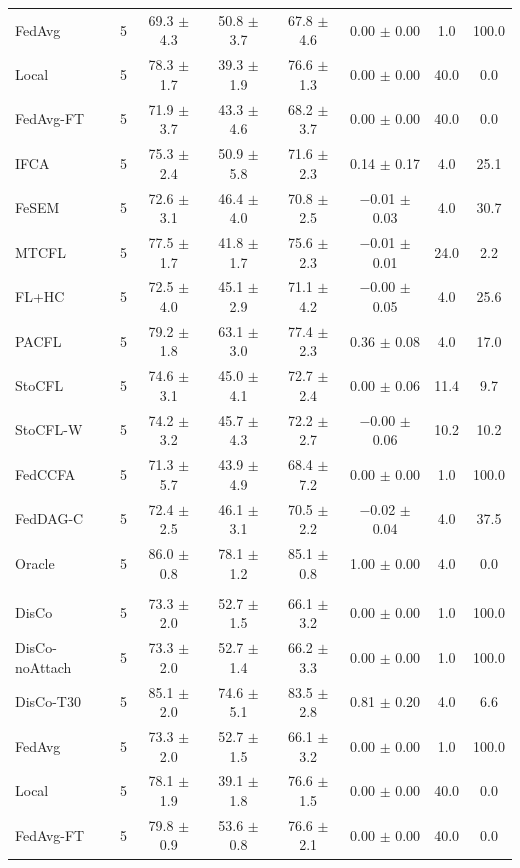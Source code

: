 {\begin{tabular}{l r c c c c c c}
FedAvg & 5 & 69.3 $\pm$ 4.3 & 50.8 $\pm$ 3.7 & 67.8 $\pm$ 4.6 & 0.00 $\pm$ 0.00 & 1.0 & 100.0 \\
Local & 5 & 78.3 $\pm$ 1.7 & 39.3 $\pm$ 1.9 & 76.6 $\pm$ 1.3 & 0.00 $\pm$ 0.00 & 40.0 & 0.0 \\
FedAvg-FT & 5 & 71.9 $\pm$ 3.7 & 43.3 $\pm$ 4.6 & 68.2 $\pm$ 3.7 & 0.00 $\pm$ 0.00 & 40.0 & 0.0 \\
IFCA & 5 & 75.3 $\pm$ 2.4 & 50.9 $\pm$ 5.8 & 71.6 $\pm$ 2.3 & 0.14 $\pm$ 0.17 & 4.0 & 25.1 \\
FeSEM & 5 & 72.6 $\pm$ 3.1 & 46.4 $\pm$ 4.0 & 70.8 $\pm$ 2.5 & $-$0.01 $\pm$ 0.03 & 4.0 & 30.7 \\
MTCFL & 5 & 77.5 $\pm$ 1.7 & 41.8 $\pm$ 1.7 & 75.6 $\pm$ 2.3 & $-$0.01 $\pm$ 0.01 & 24.0 & 2.2 \\
FL+HC & 5 & 72.5 $\pm$ 4.0 & 45.1 $\pm$ 2.9 & 71.1 $\pm$ 4.2 & $-$0.00 $\pm$ 0.05 & 4.0 & 25.6 \\
PACFL & 5 & 79.2 $\pm$ 1.8 & 63.1 $\pm$ 3.0 & 77.4 $\pm$ 2.3 & 0.36 $\pm$ 0.08 & 4.0 & 17.0 \\
StoCFL & 5 & 74.6 $\pm$ 3.1 & 45.0 $\pm$ 4.1 & 72.7 $\pm$ 2.4 & 0.00 $\pm$ 0.06 & 11.4 & 9.7 \\
StoCFL-W & 5 & 74.2 $\pm$ 3.2 & 45.7 $\pm$ 4.3 & 72.2 $\pm$ 2.7 & $-$0.00 $\pm$ 0.06 & 10.2 & 10.2 \\
FedCCFA & 5 & 71.3 $\pm$ 5.7 & 43.9 $\pm$ 4.9 & 68.4 $\pm$ 7.2 & 0.00 $\pm$ 0.00 & 1.0 & 100.0 \\
FedDAG-C & 5 & 72.4 $\pm$ 2.5 & 46.1 $\pm$ 3.1 & 70.5 $\pm$ 2.2 & $-$0.02 $\pm$ 0.04 & 4.0 & 37.5 \\
Oracle & 5 & 86.0 $\pm$ 0.8 & 78.1 $\pm$ 1.2 & 85.1 $\pm$ 0.8 & 1.00 $\pm$ 0.00 & 4.0 & 0.0 \\
\addlinespace
\multicolumn{8}{l}{\textit{SVHN label swap}} \\
DisCo & 5 & 73.3 $\pm$ 2.0 & 52.7 $\pm$ 1.5 & 66.1 $\pm$ 3.2 & 0.00 $\pm$ 0.00 & 1.0 & 100.0 \\
DisCo-noAttach & 5 & 73.3 $\pm$ 2.0 & 52.7 $\pm$ 1.4 & 66.2 $\pm$ 3.3 & 0.00 $\pm$ 0.00 & 1.0 & 100.0 \\
DisCo-T30 & 5 & 85.1 $\pm$ 2.0 & 74.6 $\pm$ 5.1 & 83.5 $\pm$ 2.8 & 0.81 $\pm$ 0.20 & 4.0 & 6.6 \\
FedAvg & 5 & 73.3 $\pm$ 2.0 & 52.7 $\pm$ 1.5 & 66.1 $\pm$ 3.2 & 0.00 $\pm$ 0.00 & 1.0 & 100.0 \\
Local & 5 & 78.1 $\pm$ 1.9 & 39.1 $\pm$ 1.8 & 76.6 $\pm$ 1.5 & 0.00 $\pm$ 0.00 & 40.0 & 0.0 \\
FedAvg-FT & 5 & 79.8 $\pm$ 0.9 & 53.6 $\pm$ 0.8 & 76.6 $\pm$ 2.1 & 0.00 $\pm$ 0.00 & 40.0 & 0.0 \\

\end{tabular}}
